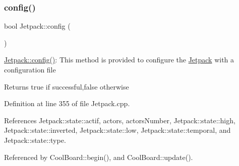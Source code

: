 \subsubsection{\texorpdfstring{config()}{config()}}
{\footnotesize\ttfamily bool Jetpack\+::config (\begin{DoxyParamCaption}{ }\end{DoxyParamCaption})}

\hyperlink{classJetpack_ab065ee83e244265a2223a22f3ee4a719}{Jetpack\+::config()}\+: This method is provided to configure the \hyperlink{classJetpack}{Jetpack} with a configuration file

\begin{DoxyReturn}{Returns}
true if successful,false otherwise 
\end{DoxyReturn}


Definition at line 355 of file Jetpack.\+cpp.



References Jetpack\+::state\+::actif, actors, actors\+Number, Jetpack\+::state\+::high, Jetpack\+::state\+::inverted, Jetpack\+::state\+::low, Jetpack\+::state\+::temporal, and Jetpack\+::state\+::type.



Referenced by Cool\+Board\+::begin(), and Cool\+Board\+::update().


